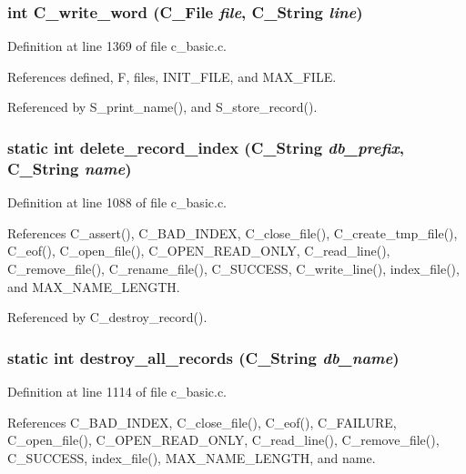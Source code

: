 \subsubsection{\setlength{\rightskip}{0pt plus 5cm}int C\_\-write\_\-word (\bf{C\_\-File} {\em file}, \bf{C\_\-String} {\em line})}\label{c__basic_8c_dd369e05981241eb4e9e6f74b422a802}




Definition at line 1369 of file c\_\-basic.c.

References defined, F, files, INIT\_\-FILE, and MAX\_\-FILE.

Referenced by S\_\-print\_\-name(), and S\_\-store\_\-record().
\subsubsection{\setlength{\rightskip}{0pt plus 5cm}static int delete\_\-record\_\-index (\bf{C\_\-String} {\em db\_\-prefix}, \bf{C\_\-String} {\em name})\hspace{0.3cm}{\tt  [static]}}\label{c__basic_8c_1e203b02f9b86240f089a28790ece9d6}




Definition at line 1088 of file c\_\-basic.c.

References C\_\-assert(), C\_\-BAD\_\-INDEX, C\_\-close\_\-file(), C\_\-create\_\-tmp\_\-file(), C\_\-eof(), C\_\-open\_\-file(), C\_\-OPEN\_\-READ\_\-ONLY, C\_\-read\_\-line(), C\_\-remove\_\-file(), C\_\-rename\_\-file(), C\_\-SUCCESS, C\_\-write\_\-line(), index\_\-file(), and MAX\_\-NAME\_\-LENGTH.

Referenced by C\_\-destroy\_\-record().
\subsubsection{\setlength{\rightskip}{0pt plus 5cm}static int destroy\_\-all\_\-records (\bf{C\_\-String} {\em db\_\-name})\hspace{0.3cm}{\tt  [static]}}\label{c__basic_8c_7947f889ea50413a206bdf1795977a18}




Definition at line 1114 of file c\_\-basic.c.

References C\_\-BAD\_\-INDEX, C\_\-close\_\-file(), C\_\-eof(), C\_\-FAILURE, C\_\-open\_\-file(), C\_\-OPEN\_\-READ\_\-ONLY, C\_\-read\_\-line(), C\_\-remove\_\-file(), C\_\-SUCCESS, index\_\-file(), MAX\_\-NAME\_\-LENGTH, and name.

